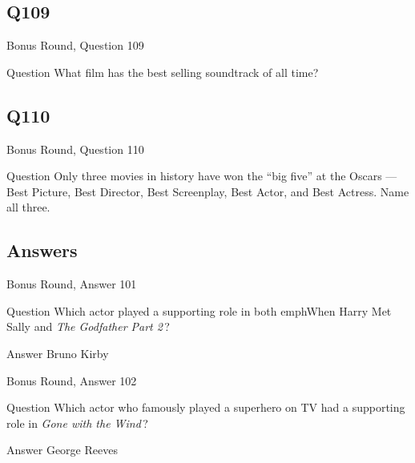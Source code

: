 \documentclass[11pt]{beamer}
\begin{document}
\subsection*{Q109}
\begin{frame}[t]{Bonus Round, Question 109}
\vspace{2em}
\begin{block}{Question}
What film has the best selling soundtrack of all time?
\end{block}
\end{frame}
    

\subsection*{Q110}
\begin{frame}[t]{Bonus Round, Question 110}
\vspace{2em}
\begin{block}{Question}
Only three movies in history have won the ``big five'' at the Oscars — Best Picture, Best Director, Best Screenplay, Best Actor, and Best Actress. Name all three.
\end{block}
\end{frame}
    
\subsection{Answers}

\begin{frame}[t]{Bonus Round, Answer 101}
\vspace{2em}
\begin{block}{Question}
Which actor played a supporting role in both emph{When Harry Met Sally} and \emph{The Godfather Part 2}\,?
\end{block}
\pause{}
\begin{block}{Answer}
Bruno Kirby
\end{block}
\end{frame}
    

\begin{frame}[t]{Bonus Round, Answer 102}
\vspace{2em}
\begin{block}{Question}
Which actor who famously played a superhero on TV had a supporting role in \emph{Gone with the Wind}\,?
\end{block}
\pause{}
\begin{block}{Answer}
George Reeves
\end{block}
\end{frame}
    
\end{document}
